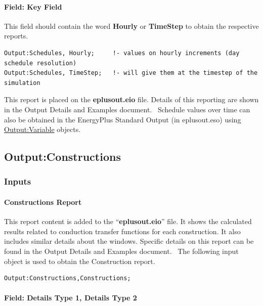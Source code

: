 \paragraph{Field: Key Field}\label{field-key-field-1}

This field should contain the word \textbf{Hourly} or \textbf{TimeStep} to obtain the respective reports.

\begin{lstlisting}
Output:Schedules, Hourly;     !- values on hourly increments (day schedule resolution)
Output:Schedules, TimeStep;   !- will give them at the timestep of the simulation
\end{lstlisting}

This report is placed on the \textbf{eplusout.eio} file. Details of this reporting are shown in the Output Details and Examples document.~ Schedule values over time can also be obtained in the EnergyPlus Standard Output (in eplusout.eso) using \hyperref[outputvariable]{Output:Variable} objects.

\subsection{Output:Constructions}\label{outputconstructions}

\subsubsection{Inputs}\label{inputs-3-030}

\paragraph{Constructions Report}\label{constructions-report}

This report content is added to the ``\textbf{eplusout.eio}'' file. It shows the calculated results related to conduction transfer functions for each construction. It also includes similar details about the windows. Specific details on this report can be found in the Output Details and Examples document.~ The following input object is used to obtain the Construction report.

\begin{lstlisting}
Output:Constructions,Constructions;
\end{lstlisting}

\paragraph{Field: Details Type 1, Details Type 2}\label{field-details-type-1-details-type-2}


